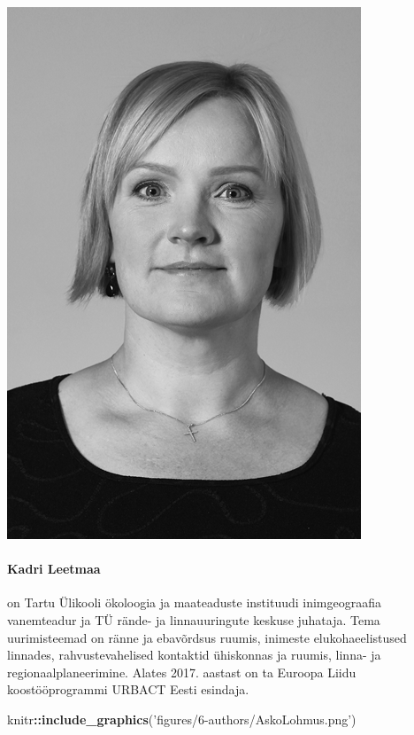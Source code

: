 \documentclass[estonian,]{article}
\newenvironment{Shaded}{\begin{snugshade}}{\end{snugshade}}
\newcommand{\KeywordTok}[1]{\textcolor[rgb]{0.13,0.29,0.53}{\textbf{#1}}}
\newcommand{\NormalTok}[1]{#1}
\newcommand{\OperatorTok}[1]{\textcolor[rgb]{0.81,0.36,0.00}{\textbf{#1}}}
\newcommand{\StringTok}[1]{\textcolor[rgb]{0.31,0.60,0.02}{#1}}
\let\oldparagraph\paragraph
\renewcommand{\paragraph}[1]{\oldparagraph{#1}\mbox{}}
\begin{document}
\begin{flushleft}\includegraphics[width=0.5\linewidth]{figures/6-authors/KadriLeetmaa} \end{flushleft}

\hypertarget{kadri-leetmaa}{%
\paragraph{Kadri Leetmaa}\label{kadri-leetmaa}}

on Tartu Ülikooli ökoloogia ja maateaduste instituudi inimgeograafia vanemteadur ja TÜ rände- ja linnauuringute keskuse juhataja. Tema uurimisteemad on ränne ja ebavõrdsus ruumis, inimeste elukohaeelistused linnades, rahvustevahelised kontaktid ühiskonnas ja ruumis, linna- ja regionaalplaneerimine. Alates 2017. aastast on ta Euroopa Liidu koostööprogrammi URBACT Eesti esindaja.

\begin{Shaded}
\begin{Highlighting}[]
\NormalTok{knitr}\OperatorTok{::}\KeywordTok{include_graphics}\NormalTok{(}\StringTok{'figures/6-authors/AskoLohmus.png'}\NormalTok{)}
\end{Highlighting}
\end{Shaded}
\end{document}
